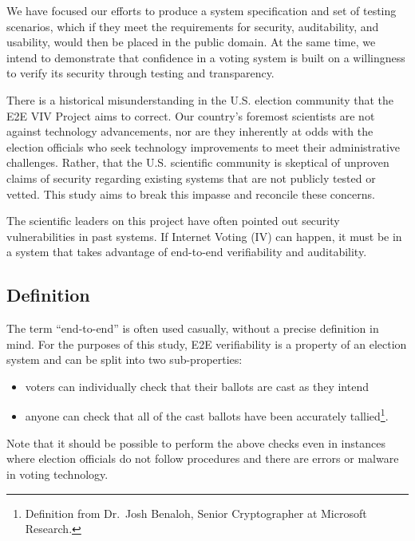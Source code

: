 We have focused our efforts to produce a system specification and set
of testing scenarios, which if they meet the requirements for
security, auditability, and usability, would then be placed in the
public domain. At the same time, we intend to demonstrate that
confidence in a voting system is built on a willingness to verify its
security through testing and transparency.

There is a historical misunderstanding in the U.S. election community
that the E2E VIV Project aims to correct. Our country’s foremost
scientists are not against technology advancements, nor are they
inherently at odds with the election officials who seek technology
improvements to meet their administrative challenges. Rather, that the
U.S. scientific community is skeptical of unproven claims of security
regarding existing systems that are not publicly tested or vetted. This
study aims to break this impasse and reconcile these concerns.

The scientific leaders on this project have often pointed out security
vulnerabilities in past systems. If Internet Voting (IV) can happen,
it must be in a system that takes advantage of end-to-end
verifiability and auditability.

\subsection{Definition}
\label{sec:definition}

The term ``end-to-end'' is often used casually, without a precise
definition in mind. For the purposes of this study, E2E verifiability
is a property of an election system and can be split into two
sub-properties:
\begin{itemize}
\item voters can individually check that their ballots are cast as they
intend
\item anyone can check that all of the cast ballots have been
  accurately tallied\footnote{Definition from Dr.~Josh Benaloh, Senior
    Cryptographer at Microsoft Research.}.
\end{itemize}
Note that it should be possible to perform the above checks even in
instances where election officials do not follow procedures and there
are errors or malware in voting technology.

